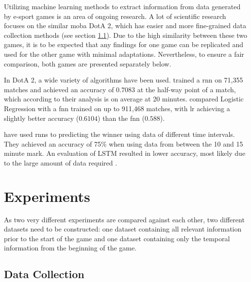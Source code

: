 \documentclass[12pt, a4paper, headinclude, twoside, plainheadsepline, open=right, numbers=noenddot, hidelinks, toc=listof, toc=bibliography]{scrreprt}
\begin{document}
Utilizing machine learning methods to extract information from data generated by e-sport games is an area of ongoing research.
A lot of scientific research focuses on the similar \ac{moba} DotA 2, which has easier and more fine-grained data collection methods (see section \ref{sec:datacoll}).
Due to the high similarity between these two games, it is to be expected that any findings for one game can be replicated and used for the other game with minimal adaptations.
Nevertheless, to ensure a fair comparison, both games are presented separately below.

In DotA 2, a wide variety of algorithms have been used.  
 \cite{yuMOBASliceTimeSlice2018} trained a \ac{rnn} on 71,355 matches and achieved an accuracy of $0.7083$ at the half-way point of a match, which according to their analysis is on average at 20 minutes.
 \cite{wangPredictingMultiplayerOnline2016} compared Logistic Regression with a \ac{fnn} trained on up to 911,468 matches, with \ac{lr} achieving a slightly better accuracy ($0.6104$) than the \ac{fnn} ($0.588$).


 have used \acp{rnn} to predicting the winner using data of different time intervals. They achieved an accuracy of 75\% when using data from between the 10 and 15 minute mark.
An evaluation of LSTM resulted in lower accuracy, most likely due to the large amount of data required \cite{silvaContinuousOutcomePrediction2018}.






\chapter{Experiments}
\label{chap:experiments}

As two very different experiments are compared against each other, two different datasets need to be constructed: one dataset containing all relevant information prior to the start of the game and one dataset containing only the temporal information from the beginning of the game.


\section{Data Collection}
\label{sec:datacoll}
\end{document}

